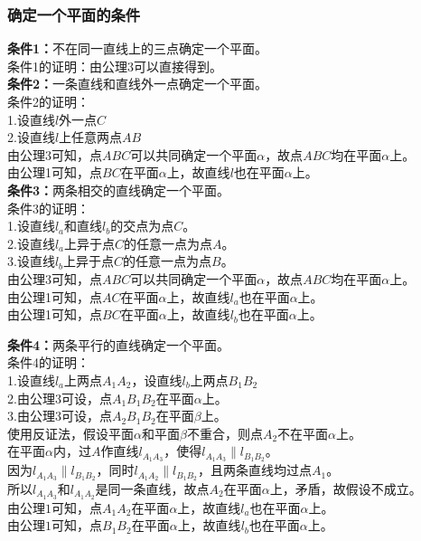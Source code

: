 \documentclass[UTF8]{ctexart}
\begin{document}
\subsubsection{确定一个平面的条件}
    \textbf{条件1：}不在同一直线上的三点确定一个平面。\\[3mm]
    条件1的证明：由公理3可以直接得到。\\[8mm]
    \textbf{条件2：}一条直线和直线外一点确定一个平面。\\[3mm]
    条件2的证明：\\[3mm]
    1.设直线$l$外一点$C$\\[2mm]
    2.设直线$l$上任意两点$AB$\\[3mm]
    由公理3可知，点$ABC$可以共同确定一个平面$\alpha$，故点$ABC$均在平面$\alpha$上。\\[2mm]
    由公理1可知，点$BC$在平面$\alpha$上，故直线$l$也在平面$\alpha$上。\\[8mm]
    \textbf{条件3：}两条相交的直线确定一个平面。\\[3mm]
    条件3的证明：\\[3mm]
    1.设直线$l_a$和直线$l_b$的交点为点$C$。\\[2mm]
    2.设直线$l_a$上异于点$C$的任意一点为点$A$。\\[2mm]
    3.设直线$l_b$上异于点$C$的任意一点为点$B$。\\[3mm]
    由公理3可知，点$ABC$可以共同确定一个平面$\alpha$，故点$ABC$均在平面$\alpha$上。\\[2mm]
    由公理1可知，点$AC$在平面$\alpha$上，故直线$l_a$也在平面$\alpha$上。\\[2mm]
    由公理1可知，点$BC$在平面$\alpha$上，故直线$l_b$也在平面$\alpha$上。

\newpage

    \textbf{条件4：}两条平行的直线确定一个平面。\\[3mm]
    条件4的证明：\\[3mm]
    1.设直线$l_a$上两点$A_1A_2$，设直线$l_b$上两点$B_1B_2$\\[2mm]
    2.由公理3可设，点$A_1B_1B_2$在平面$\alpha$上。\\[2mm]
    3.由公理3可设，点$A_2B_1B_2$在平面$\beta$上。\\[3mm]
    使用反证法，假设平面$\alpha$和平面$\beta$不重合，则点$A_2$不在平面$\alpha$上。\\[2mm]
    在平面$\alpha$内，过$A$作直线$l_{A_1A_3}$，使得$l_{A_1A_3}\parallel l_{B_1B_2}$。\\[2mm]
    因为$l_{A_1A_3}\parallel l_{B_1B_2}$，同时$l_{A_1A_2}\parallel l_{B_1B_2}$，且两条直线均过点$A_1$。\\[2mm]
    所以$l_{A_1A_3}$和$l_{A_1A_2}$是同一条直线，故点$A_2$在平面$\alpha$上，矛盾，故假设不成立。\\[2mm]
    由公理$1$可知，点$A_1A_2$在平面$\alpha$上，故直线$l_a$也在平面$\alpha$上。\\[2mm]
    由公理$1$可知，点$B_1B_2$在平面$\alpha$上，故直线$l_b$也在平面$\alpha$上。
\end{document}
